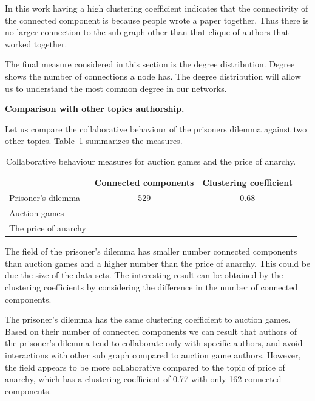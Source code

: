 \documentclass{article}
\newcommand{\pricecon}{}
\newcommand{\pricecc}{}
\newcommand{\auctioncon}{}
\newcommand{\auctioncc}{}
\begin{document}
In this work having a high clustering coefficient indicates that the connectivity
of the connected component is because people wrote a paper together. Thus there
is no larger connection to the sub graph other than that clique of authors that
worked together.

The final measure considered in this section is the degree distribution. Degree
shows the number of connections a node has. The degree distribution will allow
us to understand the most common degree in our networks.

\textbf{Comparison with other topics authorship.}

Let us compare the collaborative behaviour of the prisoners dilemma against two
other topics. Table~\ref{table:other_topics_cc} summarizes the measures.

\begin{table}[!hbtp]
    \begin{center}
    \begin{tabular}{lcc}
        \toprule
                             & \textbf{Connected components} & \textbf{Clustering coefficient}\\
        \midrule
        Prisoner's dilemma   & 529  & 0.68 \\
        Auction games        &                     \auctioncon & \auctioncc \\
        The price of anarchy &                     \pricecon & \pricecc \\
        \bottomrule
    \end{tabular}
    \end{center}
    \caption{Collaborative behaviour measures for auction games and the price of anarchy.}
    \label{table:other_topics_cc}
\end{table}

The field of the prisoner's dilemma has smaller number connected components than
auction games and a higher  number than the price of anarchy. This could be 
due the size of the data sets. The interesting result can be obtained by the
clustering coefficients by considering the difference in the number of connected
components.

The prisoner's dilemma has the same clustering coefficient to auction games.
Based on their number of connected components we can result that authors of the
prisoner's dilemma tend to collaborate only with specific authors, and avoid
interactions with other sub graph compared to auction game authors. However,
the field appears to be more collaborative compared to the topic of price of anarchy,
which has a clustering coefficient of 0.77 with only 162 connected components.
\end{document}
